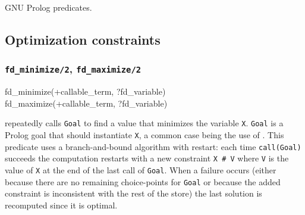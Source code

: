 \begin{PlErrors}







\end{PlErrors}

\Portability

GNU Prolog predicates.

\subsection{Optimization constraints}

\subsubsection{\texttt{fd\_minimize/2},
\texttt{fd\_maximize/2}}

\begin{TemplatesOneCol}
fd\_minimize(+callable\_term, ?fd\_variable)\\
fd\_maximize(+callable\_term, ?fd\_variable)

\end{TemplatesOneCol}

\Description

 repeatedly calls \texttt{Goal} to find a
value that minimizes the variable \texttt{X}. \texttt{Goal} is a Prolog goal
that should instantiate \texttt{X}, a common case being the use of
 . This predicate uses a
branch-and-bound algorithm with restart: each time \texttt{call(Goal)}
succeeds the computation restarts with a new constraint \texttt{X \#{\lt} V}
where \texttt{V} is the value of \texttt{X} at the end of the last call of
\texttt{Goal}. When a failure occurs (either because there are no remaining
choice-points for \texttt{Goal} or because the added constraint is
inconsistent with the rest of the store) the last solution is recomputed
since it is optimal.


